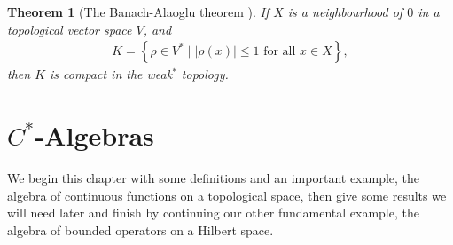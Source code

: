 \documentclass[11pt,a4paper]{report}
\theoremstyle{plain}
\newtheorem*{thm*}{Theorem}
\theoremstyle{definition}
\newcommand{\1}{\mathbbm{1}}
\begin{document}
\begin{thm*}[{The Banach-Alaoglu theorem \cite{rudin91}}]
	If $X$ is a neighbourhood of $0$ in a topological vector space $V$, and
	\begin{align*}
		K=\left\{\rho\in V^\ast \mid |\rho(x)|\leq 1 \mbox{ for all } x \in X \right\},
	\end{align*}
	then $K$ is compact in the weak$^\ast$ topology.
\end{thm*}

\chapter{$C^\ast$-Algebras}
We begin this chapter with some definitions and an important example, the 
algebra of continuous functions on a topological space, then give some results 
we will need later and finish by continuing our other fundamental example, the 
algebra of bounded operators on a Hilbert space.
\end{document}
